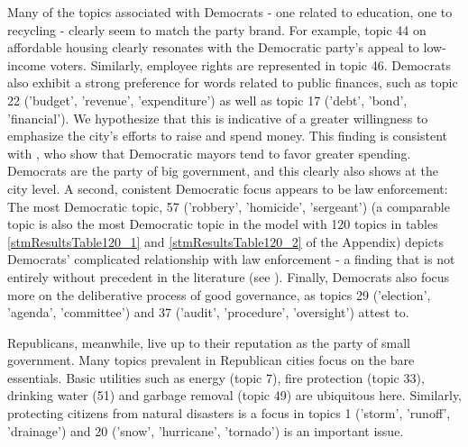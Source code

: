\documentclass[11pt]{article}
\begin{document}
Many of the topics associated with Democrats - one related to education, one to recycling  - clearly seem to match the party brand. For example, topic 44 on affordable housing clearly resonates with the Democratic party's appeal to low-income voters. Similarly, employee rights are represented in topic 46. Democrats also exhibit a strong preference for words related to public finances, such as topic 22 ('budget', 'revenue', 'expenditure') as well as topic 17 ('debt', 'bond', 'financial'). We hypothesize that this is indicative of a greater willingness to emphasize the city's efforts to raise and spend money. This finding is consistent with \citep{Einstein2015}, who show that Democratic mayors tend to favor greater spending. Democrats are the party of big government, and this clearly also shows at the city level. A second, conistent Democratic focus appears to be law enforcement: The most Democratic topic, 57 ('robbery', 'homicide', 'sergeant') (a comparable topic is also the most Democratic topic in the model with 120 topics in tables \ref{stmResultsTable120_1} and \ref{stmResultsTable120_2} of the Appendix) depicts Democrats' complicated relationship with law enforcement - a finding that is not entirely without precedent in the literature (see \citep{Einstein2015}). Finally, Democrats also focus more on the deliberative process of good governance, as topics 29 ('election', 'agenda', 'committee') and 37 ('audit', 'procedure', 'oversight') attest to.

Republicans, meanwhile, live up to their reputation as the party of small government. Many topics prevalent in Republican cities focus on the bare essentials. Basic utilities such as energy (topic 7), fire protection (topic 33), drinking water (51) and garbage removal (topic 49) are ubiquitous here. Similarly, protecting citizens from natural disasters is a focus in topics 1 ('storm', 'runoff', 'drainage') and 20 ('snow', 'hurricane', 'tornado') is an important issue.



\end{document}
